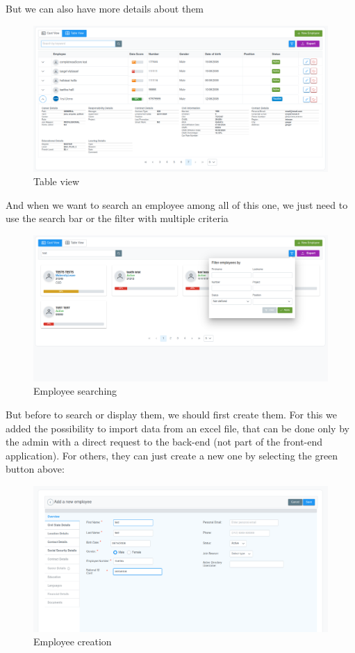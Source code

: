 \documentclass[12pt,a4paper,table,english]{article}
\begin{document}
	But we can also have more details about them
	\begin{figure}[H]
		\centering
		\includegraphics[width=150mm]{Image/tableview}
		\caption{Table view}
		\label{fig:Table view}
	\end{figure}
		
	And when we want to search an employee among all of this one, we just need to use the search bar or the filter with multiple criteria
	\begin{figure}[H]
		\centering
		\includegraphics[width=150mm]{Image/search}
		\caption{Employee searching}
		\label{fig:Employee searching}
	\end{figure}

	But before to search or display them, we should first create them.
	For this we added the possibility to import data from an excel file, that can be done only by the admin with a direct request to the back-end (not part of the front-end application). For others, they can just create a new one by selecting the green button above:

	\begin{figure}[H]
	\centering
	\includegraphics[width=150mm]{Image/employeeadd}
	\caption{Employee creation}
	\label{fig:Employee creation}
	\end{figure}
	
\end{document}

